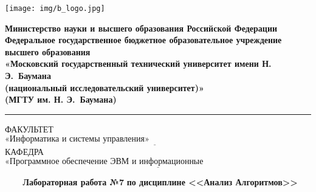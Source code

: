 \documentclass{bmstu}
\begin{document}
\renewcommand{\thelstlisting}{\arabic{lstlisting}}

\begin{titlepage}
	\fontsize{12pt}{12pt}\selectfont
	\noindent \begin{minipage}{0.15\textwidth}
		\texttt{[image: img/b\_logo.jpg]}
	\end{minipage}
	\noindent\begin{minipage}{0.9\textwidth}\centering
		\textbf{Министерство науки и высшего образования Российской Федерации}\\
		\textbf{Федеральное государственное бюджетное образовательное учреждение высшего образования}\\
		\textbf{«Московский государственный технический университет имени Н. Э.~Баумана}\\
		\textbf{(национальный исследовательский университет)»}\\
		\textbf{(МГТУ им. Н. Э.~Баумана)}
	\end{minipage}

	\noindent\rule{18cm}{3pt}
	\newline\newline
	\noindent ФАКУЛЬТЕТ $\underline{\text{«Информатика и системы управления»~~~~~~~~~~~~~~~~~~~~~~~~~~~~~~~~~~~~~~~~~~~~~~~~~~~~~~~}}$ \newline\newline
	\noindent КАФЕДРА $\underline{\text{«Программное обеспечение ЭВМ и информационные технологии»~~~~~~~~~~~~~~~~~~~~~~~}}$\newline\newline\newline\newline\newline\newline\newline


	\begin{center}
		\noindent\begin{minipage}{1.3\textwidth}\centering
		\Large\textbf{   ~~~ Лабораторная работа №7}\newline
		\textbf{по дисциплине <<Анализ Алгоритмов>>}\newline\newline\newline
		\end{minipage}
	\end{center}


\end{titlepage}
\end{document}
